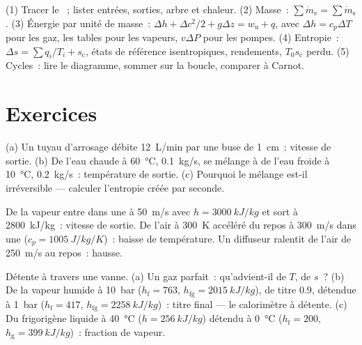 \begin{method}\label{meth:b2:open-systems:method}
(1) Tracer le ~; lister entrées, sorties, arbre et chaleur.
(2) Masse~: $\sum\dot m_{\text{e}} = \sum\dot m_{\text{s}}$. (3) Énergie
par unité de masse~: $\Delta h + \Delta c^2/2 + g\Delta z = w_{\text{u}} + q$, avec
$\Delta h = c_p\Delta T$ pour les gaz, les tables pour les vapeurs, $v\Delta P$ pour les
pompes. (4) Entropie~: $\Delta s = \sum q_i/T_i + s_{\text{c}}$, états de référence
isentropiques, rendements, $T_0s_{\text{c}}$ perdu. (5) Cycles~: lire
le diagramme, sommer sur la boucle, comparer à Carnot.
\end{method}

\section{Exercices}

\begin{exercise}[$\star$]\label{exo:b2:open-systems:1}
(a) Un tuyau d'arrosage débite \qty{12}{L/min} par une buse de \qty{1}{cm}~:
vitesse de sortie. (b) De l'eau chaude à \qty{60}{\celsius}, \qty{0.1}{kg/s},
se mélange à de l'eau froide à \qty{10}{\celsius}, \qty{0.2}{kg/s}~: température
de sortie. (c) Pourquoi le mélange est-il irréversible --- calculer
l'entropie créée par seconde.
\end{exercise}

\begin{exercise}[$\star$]\label{exo:b2:open-systems:2}
De la vapeur entre dans une  à \qty{50}{m/s} avec $h = \qty{3000}{kJ/kg}$ et
sort à \qty{2800}{kJ/kg}~: vitesse de sortie. De l'air à \qty{300}{K} accéléré
du repos à \qty{300}{m/s} dans une  ($c_p = \qty{1005}{J/kg/K}$)~:
baisse de température. Un diffuseur ralentit de l'air de \qty{250}{m/s} au repos~: hausse.
\end{exercise}

\begin{exercise}[$\star$]\label{exo:b2:open-systems:3}
Détente à travers une vanne. (a) Un gaz parfait~: qu'advient-il de $T$, de $s$~? (b) De la vapeur humide
à \qty{10}{bar} ($h_{\text{f}} = 763$, $h_{\text{fg}} = \qty{2015}{kJ/kg}$),
de titre $0.9$, détendue à \qty{1}{bar} ($h_{\text{f}} = 417$, $h_{\text{fg}}
= \qty{2258}{kJ/kg}$)~: titre final --- le calorimètre à détente. (c)
Du frigorigène liquide à \qty{40}{\celsius} ($h = \qty{256}{kJ/kg}$) détendu
à \qty{0}{\celsius} ($h_{\text{f}} = 200$, $h_{\text{g}} = \qty{399}{kJ/kg}$)~:
fraction de vapeur.
\end{exercise}

